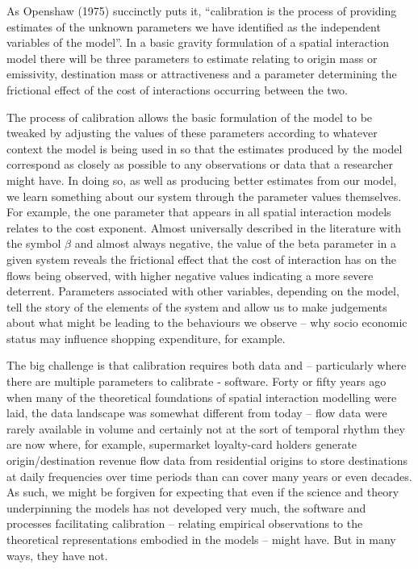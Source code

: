 \documentclass[11pt,letterpaper]{article}
\begin{document}
As Openshaw (1975) succinctly puts it, ``calibration is the process of providing estimates of the unknown parameters we have identified as the independent variables of the model''.
In a basic gravity formulation of a spatial interaction model there will be three parameters to estimate relating to origin mass or emissivity, destination mass or attractiveness and a parameter determining the frictional effect of the cost of interactions occurring between the two.

The process of calibration allows the basic formulation of the model to be tweaked by adjusting the values of these parameters according to whatever context the model is being used in so that the estimates produced by the model correspond as closely as possible to any observations or data that a researcher might have.
In doing so, as well as producing better estimates from our model, we learn something about our system through the parameter values themselves.
For example, the one parameter that appears in all spatial interaction models relates to the cost exponent.
Almost universally described in the literature with the symbol \(\beta\) and almost always negative, the value of the beta parameter in a given system reveals the frictional effect that the cost of interaction has on the flows being observed, with higher negative values indicating a more severe deterrent.
Parameters associated with other variables, depending on the model, tell the story of the elements of the system and allow us to make judgements about what might be leading to the behaviours we observe -- why socio economic status may influence shopping expenditure, for example.

The big challenge is that calibration requires both data and -- particularly where there are multiple parameters to calibrate - software.
Forty or fifty years ago when many of the theoretical foundations of spatial interaction modelling were laid, the data landscape was somewhat different from today -- flow data were rarely available in volume and certainly not at the sort of temporal rhythm they are now where, for example, supermarket loyalty-card holders generate origin/destination revenue flow data from residential origins to store destinations at daily frequencies over time periods than can cover many years or even decades.
As such, we might be forgiven for expecting that even if the science and theory underpinning the models has not developed very much, the software and processes facilitating calibration -- relating empirical observations to the theoretical representations embodied in the models -- might have.
But in many ways, they have not.
\end{document}
